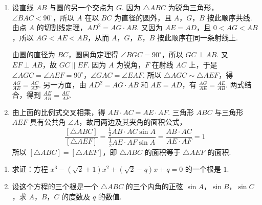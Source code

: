 \begin{solution}
\begin{enumerate}
\item 设直线 \(AB\) 与圆的另一个交点为 \(G\). 因为 \(\triangle ABC\) 为锐角三角形，\(\angle BAC<90^{\circ}\)，所以 \(A\) 在以 \(BC\) 为直径的圆外，且 \(A\)，\(G\)，\(B\) 按此顺序共线. 由点 \(A\) 的切割线定理，\(AD^2=AG\cdot AB\). 又因为 \(AE=AD\)，且 \(0<AG<AB\)，所以 \(AG<AE<AB\)，从而 \(A\)，\(G\)，\(E\)，\(B\) 按此顺序在同一条射线上.

由圆的直径为 \(BC\)，圆周角定理得 \(\angle BGC=90^{\circ}\)，所以 \(GC\perp AB\). 又 \(EF\perp AB\)，故 \(GC\parallel EF\). 因为 \(A\) 为锐角，\(F\) 在射线 \(AC\) 上，于是 \(\angle AGC=\angle AEF=90^{\circ}\)，\(\angle GAC=\angle EAF\). 所以 \(\triangle AGC\sim\triangle AEF\)，得 \(\frac{AG}{AE}=\frac{AC}{AF}\). 另一方面，由 \(AD^2=AG\cdot AB\) 和 \(AE=AD\)，有 \(\frac{AG}{AE}=\frac{AE}{AB}\). 两式结合，得到 \(\frac{AE}{AB}=\frac{AC}{AF}\).

\item 由上面的比例式交叉相乘，得 \(AB\cdot AC=AE\cdot AF\). 三角形 \(ABC\) 与三角形 \(AEF\) 具有公共角 \(\angle A\)，故用两边及其夹角的面积公式，
\[
\frac{[\triangle ABC]}{[\triangle AEF]}=\frac{\frac12 AB\cdot AC\sin A}{\frac12 AE\cdot AF\sin A}=\frac{AB\cdot AC}{AE\cdot AF}=1
\]
所以 \([\triangle ABC]=[\triangle AEF]\)，即 \(\triangle ABC\) 的面积等于 \(\triangle AEF\) 的面积.
\end{enumerate}

\end{solution}

\begin{problem}
\begin{enumerate}
\item 求证：方程 \(x^{3}-(\sqrt2+1)x^{2}+(\sqrt2-q)x+q=0\) 的一个根是 \(1\).
\item 设这个方程的三个根是一个 \(\triangle ABC\) 的三个内角的正弦 \(\sin A\)，\(\sin B\)，\(\sin C\)，求 \(A\)，\(B\)，\(C\) 的度数及 \(q\) 的数值.
\end{enumerate}
\end{problem}

